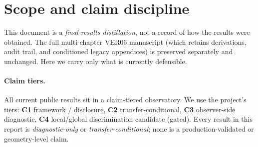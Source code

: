 \documentclass[11pt,a4paper]{article}
\newcommand{\Otilt}{\Omega_{\mathrm{tilt}}}
\theoremstyle{plain}
\theoremstyle{definition}
\begin{document}
\begin{abstract}
false-positive rate, and quantifies a peculiar-velocity $\Otilt$ prior
(a feasible low-rank bulk-flow covariance reproducing the CF4 amplitude,
with a JWST-anchored precision forecast) that breaks the shear--tilt
degeneracy; it measures the off-diagonal BipoSH statistical isotropy of
the real SMICA map (consistent with isotropy); it maps the CF4 bulk-flow
apex profile; and it proves an exact dust-FLRW constraint-transport
oracle (machine-checked with the Wolfram Engine and an independent xAct
canonicalization). It does \emph{not} establish
a globally significant low-$\ell$ anomaly, an anisotropic geometry, or a
Bianchi-family identification---and it produces no false anisotropy
claim.
\end{abstract}

\tableofcontents
\medskip

\section{Scope and claim discipline}
\label{sec:scope}

This document is a \emph{final-results distillation}, not a record of
how the results were obtained. The full multi-chapter VER06
manuscript (which retains derivations, audit trail, and conditioned
legacy appendices) is preserved separately and unchanged. Here we
carry only what is currently defensible.

\paragraph{Claim tiers.}
All current public results sit in a claim-tiered observatory. We use
the project's tiers: \textbf{C1} framework / disclosure, \textbf{C2}
transfer-conditional, \textbf{C3} observer-side diagnostic, \textbf{C4}
local/global discrimination candidate (gated). Every result in this
report is \emph{diagnostic-only} or \emph{transfer-conditional};
none is a production-validated or geometry-level claim.
\end{document}
